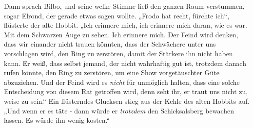 Dann sprach Bilbo, und seine welke Stimme ließ den ganzen Raum verstummen, sogar Elrond, der gerade etwas sagen wollte. „Frodo hat recht, fürchte ich“, flüsterte der alte Hobbit. „Ich erinnere mich, ich erinnere mich daran, wie es war. Mit dem Schwarzen Auge zu sehen. Ich erinnere mich. Der Feind wird denken, dass wir einander nicht trauen könnten, dass der Schwächere unter uns vorschlagen wird, den Ring zu zerstören, damit der Stärkere ihn nicht haben kann. Er weiß, dass selbst jemand, der nicht wahrhaftig gut ist, trotzdem danach rufen könnte, den Ring zu zerstören, um eine Show vorgetäuschter Güte abzuziehen. Und der Feind wird es \emph{nicht} für unmöglich halten, dass eine solche Entscheidung von diesem Rat getroffen wird, denn seht ihr, er traut uns nicht zu, weise zu sein.“ Ein flüsterndes Glucksen stieg aus der Kehle des alten Hobbits auf. „Und wenn er es täte - dann würde er \emph{trotzdem} den Schicksalsberg bewachen lassen. Es würde ihn wenig kosten.“

